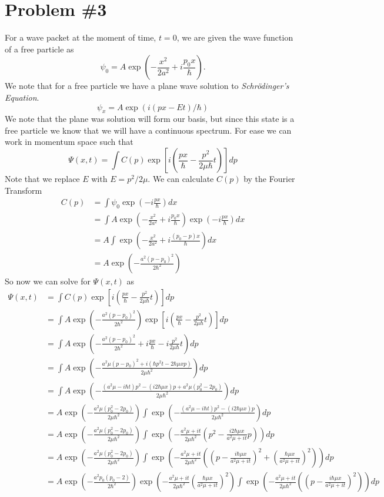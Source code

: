 \documentclass[11pt]{article}
\numberwithin{equation}{section}
\begin{document}
\section{Problem \#3}
For a wave packet at the moment of time, $t=0$, we are given the wave function of a free 
particle as
$$\psi_0 = A\exp\left(-\frac{x^2}{2a^2}+i\frac{p_0x}{\hbar}\right).$$
We note that for a free particle we have a plane wave solution to \emph{Schr\"{o}dinger's 
Equation}. 
$$\psi_x = A\exp\left(i(px-Et)/\hbar\right)$$
We note that the plane was solution will form our basis, but since this state is a free 
particle we know that we will have a continuous spectrum. For ease we can work in 
momentum space such that
$$\Psi(x,t) = \int C(p)\exp\left[i\left(\frac{px}{\hbar}-\frac{p^2}{2\mu\hbar}t\right)\right]dp$$
Note that we replace $E$ with $E=p^2/2\mu$. We can calculate $C(p)$ by the Fourier Transform 
\begin{align*}
C(p) &= \int\psi_0\exp\left(-i\frac{px}{\hbar}\right)dx\\
&= \int A\exp\left(-\frac{x^2}{2a^2}+i\frac{p_0x}{\hbar}\right)\exp\left(-i\frac{px}{\hbar}\right)dx\\
&= A\int \exp\left(-\frac{x^2}{2a^2}+i\frac{(p_0-p)x}{\hbar}\right)dx\\
&= A\exp\left(-\frac{a^2(p-p_0)^2}{2\hbar^2}\right)
\end{align*}
So now we can solve for $\Psi(x,t)$ as
\begin{align*}
\Psi(x,t) &= \int C(p)\exp\left[i\left(\frac{px}{\hbar}-\frac{p^2}{2\mu\hbar}t\right)\right]dp\\
&= \int A\exp\left(-\frac{a^2(p-p_0)^2}{2\hbar^2}\right)\exp\left[i\left(\frac{px}{\hbar}-\frac{p^2}{2\mu\hbar}t\right)\right]dp\\
&= \int A\exp\left(-\frac{a^2(p-p_0)^2}{2\hbar^2} + i\frac{px}{\hbar}-i\frac{p^2}{2\mu\hbar}t\right)dp\\
&= \int A\exp\left(-\frac{a^2\mu(p-p_0)^2+i(\hbar p^2t-2\hbar\mu xp)}{2\mu\hbar^2}\right)dp\\
&= \int A\exp\left(-\frac{(a^2\mu-i\hbar t)p^2-(i2\hbar\mu x)p +a^2\mu(p_0^2-2p_0)}{2\mu\hbar^2}\right)dp\\
&= A\exp\left(-\frac{a^2\mu(p_0^2-2p_0)}{2\mu\hbar^2}\right)\int \exp\left(-\frac{(a^2\mu-i\hbar t)p^2-(i2\hbar\mu x)p}{2\mu\hbar^2}\right)dp\\
&= A\exp\left(-\frac{a^2\mu(p_0^2-2p_0)}{2\mu\hbar^2}\right)\int \exp\left(-\frac{a^2\mu+it}{2\mu\hbar^2}\left(p^2-\frac{i2\hbar\mu x}{a^2\mu+it}p\right)\right)dp\\
&= A\exp\left(-\frac{a^2\mu(p_0^2-2p_0)}{2\mu\hbar^2}\right)\int \exp\left(-\frac{a^2\mu+it}{2\mu\hbar^2}\left(\left(p-\frac{i\hbar\mu x}{a^2\mu+it}\right)^2 + \left(\frac{\hbar\mu x}{a^2\mu +it}\right)^2\right)\right)dp\\
&= A\exp\left(-\frac{a^2p_0(p_0-2)}{2\hbar^2}\right)\exp\left(-\frac{a^2\mu+it}{2\mu\hbar^2}\left(\frac{\hbar\mu x}{a^2\mu +it}\right)^2\right)\int\exp\left(-\frac{a^2\mu+it}{2\mu\hbar^2}\left(\left(p-\frac{i\hbar\mu x}{a^2\mu+it}\right)^2\right)\right)dp\\
\end{align*}
\end{document}
